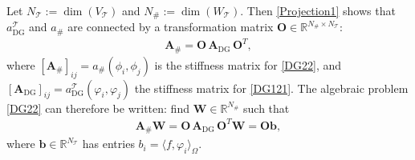 \documentclass[11pt,final]{amsart}
\theoremstyle{plain}
\theoremstyle{definition}
\newcommand\calT{{\mathcal{T}}}
\begin{document}
Let $N_{\calT} := \dim(V_\calT)$ and $N_{\#} := \dim(W_\calT)$. Then
\eqref{Projection1} shows that $a_{\mathrm{DG}}^{\calT}$ and $a_{\#}$
are connected by a transformation matrix
$\mathbf{O}\in\mathbb{R}^{N_{\#}\times N_{\calT}}$:
\begin{align}
  \mathbf{A}_{\#}
  =
  \mathbf{O}\,\mathbf{A}_{\mathrm{DG}}\,\mathbf{O}^{T}, \label{Transformation}
\end{align}
where $[\mathbf{A}_{\#}]_{ij}=a_{\#}(\phi_{i},\phi_{j})$ is the
stiffness matrix for \eqref{DG22}, and
$[\mathbf{A}_{\mathrm{DG}}]_{ij}=a_{\mathrm{DG}}^{\calT}(\varphi_{i},\varphi_{j})$
the stiffness matrix for \eqref{DG121}. The algebraic problem
\eqref{DG22} can therefore be written: find
$\mathbf{W}\in \mathbb{R}^{N_{\#}}$ such that
\begin{align}
  \mathbf{A}_{\#}\mathbf{W}=\mathbf{O}\,\mathbf{A}_{\mathrm{DG}}\,\mathbf{O}^{T}\mathbf{W}= \mathbf{O}\mathbf{b},
\end{align}
where $\mathbf{b}\in \mathbb{R}^{N_{\calT}}$ has entries
$b_{i}=\langle f,\varphi_{i}\rangle_{\Omega}$.
\end{document}

